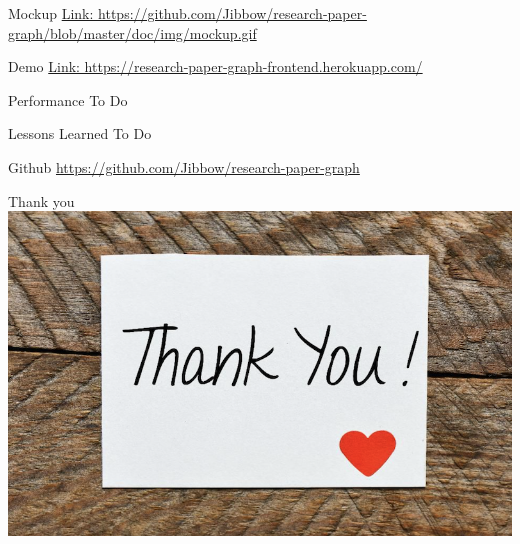 \documentclass{beamer}
\begin{document}
\begin{frame}{Mockup}
    \url{Link: https://github.com/Jibbow/research-paper-graph/blob/master/doc/img/mockup.gif}
\end{frame}

\begin{frame}{Demo}
    \url{Link: https://research-paper-graph-frontend.herokuapp.com/}
\end{frame}

\begin{frame}{Performance}
{To Do}
\end{frame}

\begin{frame}{Lessons Learned}
    {To Do}
\end{frame}

\begin{frame}{Github}
    \url{https://github.com/Jibbow/research-paper-graph}
\end{frame}

\begin{frame}{Thank you}
    \includegraphics{img_05.png}
\end{frame}
\end{document}
